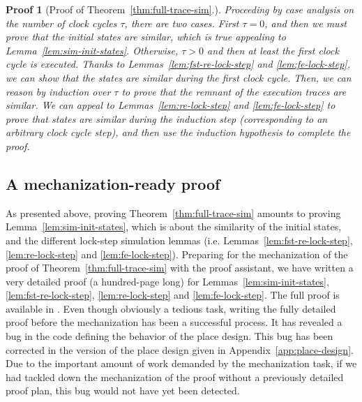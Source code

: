 \documentclass[pdflatex,sn-mathphys]{sn-jnl}%
\theoremstyle{thmstyleone}%
\theoremstyle{thmstyletwo}%
\newtheorem*{pf}{Proof}%
\theoremstyle{thmstylethree}%
\begin{document}
\begin{pf}[Proof of Theorem~\ref{thm:full-trace-sim}.]
  
  Proceeding by case analysis on the number of clock cycles $\tau$,
  there are two cases. First $\tau=0$, and then we must prove that the
  initial states are similar, which is true appealing to
  Lemma~\ref{lem:sim-init-states}. Otherwise, $\tau>0$ and then at
  least the first clock cycle is executed. Thanks to
  Lemmas~\ref{lem:fst-re-lock-step} and \ref{lem:fe-lock-step}, we can
  show that the states are similar during the first clock cycle. Then,
  we can reason by induction over $\tau$ to prove that the remnant of
  the execution traces are similar. We can appeal to
  Lemmas~\ref{lem:re-lock-step} and \ref{lem:fe-lock-step} to prove
  that states are similar during the induction step (corresponding to
  an arbitrary clock cycle step), and then use the induction
  hypothesis to complete the proof.

\end{pf}

\subsection{A mechanization-ready proof}
\label{sec:mecha-ready-pf}

As presented above, proving Theorem~\ref{thm:full-trace-sim} amounts
to proving Lemma~\ref{lem:sim-init-states}, which is about the
similarity of the initial states, and the different lock-step
simulation lemmas (i.e. Lemmas~\ref{lem:fst-re-lock-step},
\ref{lem:re-lock-step} and \ref{lem:fe-lock-step}). Preparing for the
mechanization of the proof of Theorem~\ref{thm:full-trace-sim} with
the \coq{} proof assistant, we have written a very detailed proof (a
hundred-page long) for Lemmas~\ref{lem:sim-init-states},
\ref{lem:fst-re-lock-step}, \ref{lem:re-lock-step} and
\ref{lem:fe-lock-step}. The full proof is available in
\cite{Iampietro2021}. Even though obviously a tedious task, writing
the fully detailed proof before the mechanization has been a
successful process. It has revealed a bug in the \vhdl{} code defining
the behavior of the place design. This bug has been corrected in the
version of the place design given in Appendix~\ref{app:place-design}.
Due to the important amount of work demanded by the mechanization
task, if we had tackled down the mechanization of the proof without a
previously
detailed proof plan, this bug would not have yet been detected. \\
\end{document}
